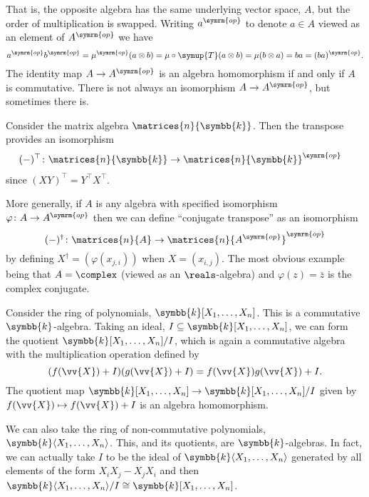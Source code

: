 \documentclass[fleqn]{NotesClass}
\newcommand{\switch}{\symup{T}}
\newcommand{\isomorphic}{\cong}
\renewcommand{\field}{\symbb{k}}
\newcommand{\op}{\symrm{op}}
\newcommand{\trans}{\top}
\begin{document}
    That is, the opposite algebra has the same underlying vector space, \(A\), but the order of multiplication is swapped.
    Writing \(a^{\op}\) to denote \(a \in A\) viewed as an element of \(A^{\op}\) we have
    \begin{equation}
        a^{\op} b^{\op} = \mu^{\op}(a \otimes b) = \mu \circ \switch (a \otimes b) = \mu(b \otimes a) = ba = (ba)^{\op}.
    \end{equation}
    The identity map \(A \to A^{\op}\) is an algebra homomorphism if and only if \(A\) is commutative.
    There is not always an isomorphism \(A \to A^{\op}\), but sometimes there is.
    
    \begin{exm}{}{}
        Consider the matrix algebra \(\matrices{n}{\field}\).
        Then the transpose provides an isomorphism
        \begin{align}
            (-)^{\trans} \colon \matrices{n}{\field} &\to \matrices{n}{\field}^{\op}
        \end{align}
        since \((X Y)^{\trans} = Y^{\trans} X^{\trans}\).
        
        More generally, if \(A\) is any algebra with specified isomorphism \(\varphi \colon A \to A^{\op}\) then we can define \enquote{conjugate transpose} as an isomorphism
        \begin{equation}
            (-)^{\dagger} \colon \matrices{n}{A} \to \matrices{n}{A^{\op}}^{\op}
        \end{equation}
        by defining \(X^{\dagger} = (\varphi(x_{j,i}))\) when \(X = (x_{i,j})\).
        The most obvious example being that \(A = \complex\) (viewed as an \(\reals\)-algebra) and \(\varphi(z) = \overbar{z}\) is the complex conjugate.
    \end{exm}
    
    \begin{exm}{}{}
        Consider the ring of polynomials, \(\field[X_1, \dotsc, X_n]\).
        This is a commutative \(\field\)-algebra.
        Taking an ideal, \(I \subseteq \field[X_1, \dotsc, X_n]\), we can form the quotient \(\field[X_1, \dotsc, X_n]/I\), which is again a commutative algebra with the multiplication operation defined by
        \begin{equation}
            (f(\vv{X}) + I) (g(\vv{X}) + I) = f(\vv{X})g(\vv{X}) + I.
        \end{equation}
        The quotient map \(\field[X_1, \dotsc, X_n] \to \field[X_1, \dotsc, X_n] / I\) given by \(f(\vv{X}) \mapsto f(\vv{X}) + I\) is an algebra homomorphism.
        
        We can also take the ring of non-commutative polynomials, \(\field\langle X_1, \dotsc, X_n \rangle\).
        This, and its quotients, are \(\field\)-algebras.
        In fact, we can actually take \(I\) to be the ideal of \(\field\langle X_1, \dotsc, X_n\rangle\) generated by all elements of the form \(X_iX_j - X_jX_i\) and then \(\field\langle X_1, \dotsc, X_n\rangle / I \isomorphic \field[X_1, \dotsc, X_n]\).
    \end{exm}
    
\end{document}
